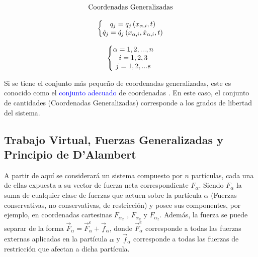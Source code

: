\documentclass[/home/hernan-barquero/Documents/Apuntes_mecanica_teorica/main.tex]{subfiles}
\begin{document}
\begin{definition}
\begin{equation*}
\begin{matrix}
                \begin{matrix}
                    \textup{Coordenadas Generalizadas} \\ 
                    \\ 
                    \left\{\begin{matrix}
                                q_{j} = q_{j} \left ( x_{\alpha,i}, t \right )\\ 
                                \dot{q}_{j} = \dot{q}_{j} \left ( x_{\alpha,i}, \dot{x}_{\alpha,i} , t\right )
                            \end{matrix}\right .
                
                \end{matrix} 
                \\ 
                \\ 
                \left\{\begin{matrix}
                            \alpha = 1,2,...,n\\ 
                            i= 1,2,3\\ 
                            j= 1,2,...s
                        \end{matrix}\right .
            \end{matrix}
        \end{equation*}

        Si se tiene el conjunto más pequeño de coordenadas generalizadas, este es conocido como el \textcolor{blue}{conjunto adecuado} de coordenadas . En este caso, el conjunto de cantidades (Coordenadas Generalizadas) corresponde a los grados de libertad del sistema.
    \end{definition}

    \subsection{Trabajo Virtual, Fuerzas Generalizadas y Principio de D'Alambert}

    A partir de aquí se considerará un sistema compuesto por $n$ partículas, cada una de ellas expuesta a su vector de fuerza neta correspondiente $F_{\alpha}$. Siendo $F_{\alpha}$ la suma de cualquier clase de fuerzas que actuen sobre la partícula $\alpha$ (Fuerzas conservativas,  no conservativas, de restricción) y posee sus componentes, por ejemplo, en coordenadas cartesinas $F_{\alpha_{x}}$ , $F_{\alpha_{y}}$ y $F_{\alpha_{z}}$. Además, la fuerza se puede separar de la forma $\vec{F}_{\alpha} = \vec{F}_{\alpha} ^{e} + \vec{f}_{\alpha} $, donde $\vec{F}_{\alpha} ^{e}$ corresponde a todas las fuerzas externas aplicadas en la partícula $\alpha$ y $\vec{f}_{\alpha}$ corresponde a todas las fuerzas de restricción que afectan a dicha partícula.
\end{document}
